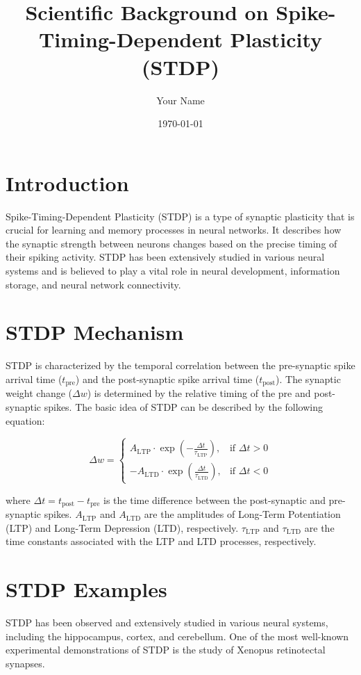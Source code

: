 \documentclass{article}
\begin{document}
\title{Scientific Background on Spike-Timing-Dependent Plasticity (STDP)}
\author{Your Name}
\date{\today}
\maketitle

\section{Introduction}
Spike-Timing-Dependent Plasticity (STDP) is a type of synaptic plasticity that is crucial for learning and memory processes in neural networks. It describes how the synaptic strength between neurons changes based on the precise timing of their spiking activity. STDP has been extensively studied in various neural systems and is believed to play a vital role in neural development, information storage, and neural network connectivity.

\section{STDP Mechanism}
STDP is characterized by the temporal correlation between the pre-synaptic spike arrival time (\(t_{\text{pre}}\)) and the post-synaptic spike arrival time (\(t_{\text{post}}\)). The synaptic weight change (\(\Delta w\)) is determined by the relative timing of the pre and post-synaptic spikes. The basic idea of STDP can be described by the following equation:

\begin{equation}
\Delta w = 
\begin{cases}
A_{\text{LTP}} \cdot \exp\left(-\frac{\Delta t}{\tau_{\text{LTP}}}\right), & \text{if } \Delta t > 0 \\
-A_{\text{LTD}} \cdot \exp\left(\frac{\Delta t}{\tau_{\text{LTD}}}\right), & \text{if } \Delta t < 0
\end{cases}
\end{equation}

where \(\Delta t = t_{\text{post}} - t_{\text{pre}}\) is the time difference between the post-synaptic and pre-synaptic spikes. \(A_{\text{LTP}}\) and \(A_{\text{LTD}}\) are the amplitudes of Long-Term Potentiation (LTP) and Long-Term Depression (LTD), respectively. \(\tau_{\text{LTP}}\) and \(\tau_{\text{LTD}}\) are the time constants associated with the LTP and LTD processes, respectively.

\section{STDP Examples}
STDP has been observed and extensively studied in various neural systems, including the hippocampus, cortex, and cerebellum. One of the most well-known experimental demonstrations of STDP is the study of Xenopus retinotectal synapses.
\end{document}

